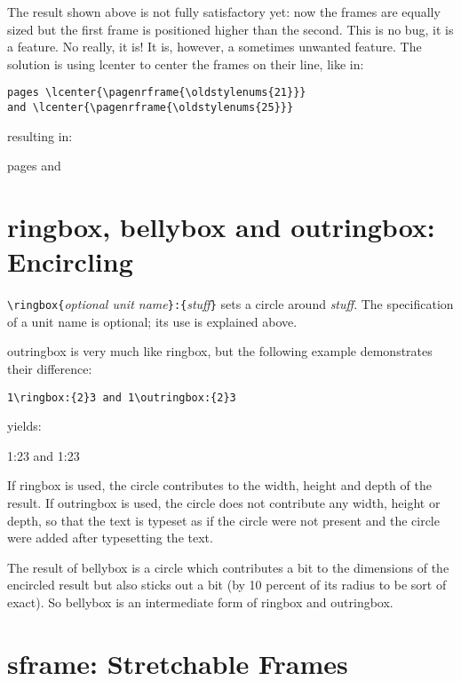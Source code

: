 \documentclass[11pt]{article}
\makeatletter
\def\macroname#1{{\ttfamily\@ttbs#1}}  %
\def\={\verb=}
\def\<#1>{\macroname{#1}}
\makeatother
\begin{document}
The result shown above is not fully satisfactory yet: now the frames are
equally sized but the first frame is positioned higher than the second.
This is no bug, it is a feature. No really, it is! It is, however, a
sometimes unwanted feature. The solution is using \<lcenter> to center
the frames on their line, like in:

\begin{verbatim}
pages \lcenter{\pagenrframe{\oldstylenums{21}}}
and \lcenter{\pagenrframe{\oldstylenums{25}}}
\end{verbatim}

resulting in:

pages 
and 

\section{\<ringbox>, \<bellybox> and \<outringbox>: Encircling}

\=\ringbox{={\it optional unit name\/}\=}:{={\it stuff\/}\=}= sets
a circle around {\it stuff\/}. The specification of a unit name is optional;
its use is explained above.

\<outringbox> is very much like \<ringbox>,
but the following example demonstrates their difference:

\begin{verbatim}
1\ringbox:{2}3 and 1\outringbox:{2}3
\end{verbatim}

yields:

1\ringbox:{2}3 and 1\outringbox:{2}3

If \<ringbox> is used, the circle contributes to the width, height and
depth of the result. If \<outringbox> is used, the circle does not
contribute any width, height or depth, so that the text is typeset as
if the circle were not present and the circle were added after typesetting
the text.

The result of \<bellybox> is a circle which contributes a bit to the
dimensions of the encircled result but also sticks out a bit
(by 10 percent of its radius to be sort of exact). So \<bellybox> is
an intermediate form of \<ringbox> and \<outringbox>.

\section{\<sframe>: Stretchable Frames}
\end{document}
